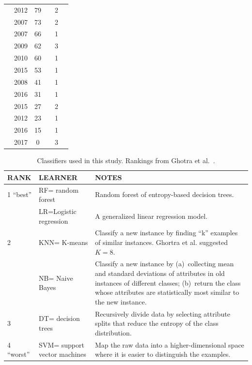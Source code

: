 \documentclass[sigconf]{acmart}
\newcommand{\cmark}{\ding{51}}%
\newcommand{\xmark}{\ding{55}}%
\theoremstyle{break}
\theoremstyle{break}
\begin{document}
\begin{table}[!b]
\begin{tabular}{c|c|c|c|c|c}
        \cite{li2012sample} & 2012 & 79 & \cmark & 2 & \xmark  \\ 
        \cite{kamei2007effects} & 2007 & 73 & \xmark & 2 & \cmark\\  
        \cite{pelayo2007applying} & 2007 & 66 & \xmark & 1 & \cmark \\  
        \cite{jiang2009variance} & 2009 & 62 & \cmark & 3 & \xmark  \\ 
        \cite{khoshgoftaar2010attribute} & 2010 & 60 & \cmark & 1 & \cmark  \\  
        \cite{ghotra2015revisiting} & 2015 & 53 & \cmark & 1 & \xmark  \\  
        \cite{jiang2008can} & 2008 & 41 & \cmark & 1 & \xmark  \\  
         \cite{tantithamthavorn2016automated} & 2016 & 31 & \cmark & 1 & \xmark  \\ 
        \cite{tan2015online} & 2015 & 27 & \xmark & 2 & \cmark \\  
        \cite{pelayo2012evaluating} & 2012 & 23 & \xmark & 1 & \cmark \\  
        \cite{fu2016tuning} & 2016 & 15 & \cmark & 1 & \xmark  \\  
        \cite{bennin2017mahakil} & 2017 & 0 & \cmark & 3 & \cmark \\
\end{tabular}
\vspace{-0.3cm}
\end{table}

 \begin{table}[!t]
 \caption{Classifiers used in this study.
 Rankings
 from Ghotra et al.~\cite{ghotra2015revisiting}.}
 \vspace{-0.2cm}
 \label{tbl:learners}
 \footnotesize
 \begin{tabular}{l|l|p{4.5in}}
{\bf RANK} & {\bf LEARNER} & {\bf NOTES}\\\hline
 1 ``best'' & RF= random forest & 
 Random forest of entropy-based decision trees.\\\cline{2-3}
 &  LR=Logistic regression &
 A generalized linear regression
model.\\\hline
 2 & KNN= K-means &  Classify a new instance by finding ``k'' examples of similar instances.
 Ghortra et al. suggested
 $K=8$.\\\cline{2-3}
 & NB= Naive Bayes &  Classify a new instance by (a)~collecting mean and standard deviations of attributes in old instances of  different classes; (b)~return the class whose attributes are statistically most similar to the new instance.\\\hline
 3 & DT= decision trees & Recursively
 divide data by selecting attribute splits
 that reduce the entropy of the class distribution.\\\hline

 4 ``worst'' & SVM= support vector machines &
 Map the raw data into a higher-dimensional space where it is easier to distinguish the examples.
 \\\hline
 \end{tabular}
 \vspace{-0.2cm}
 \end{table}
 
\end{document}
